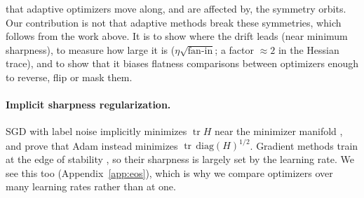 \documentclass[10pt]{article}
\theoremstyle{remark}
\newcommand{\tr}{\operatorname{tr}}
\begin{document}
that adaptive optimizers move along, and are affected by, the symmetry orbits. Our contribution is not that adaptive methods break these symmetries, which follows from the work above. It is to show where the drift leads (near minimum sharpness), to measure how large it is ($\eta\sqrt{\text{fan-in}}$; a factor $\approx2$ in the Hessian trace), and to show that it biases flatness comparisons between optimizers enough to reverse, flip or mask them.

\paragraph{Implicit sharpness regularization.} SGD with label noise implicitly minimizes $\tr H$ near the minimizer manifold \citep{blanc2020implicit,damian2021label}, and \citet{li2025adam} prove that Adam instead minimizes $\tr\,\mathrm{diag}(H)^{1/2}$. Gradient methods train at the edge of stability \citep{cohen2021eos,cohen2022adaptive}, so their sharpness is largely set by the learning rate. We see this too (Appendix~\ref{app:eos}), which is why we compare optimizers over many learning rates rather than at one.
\end{document}
